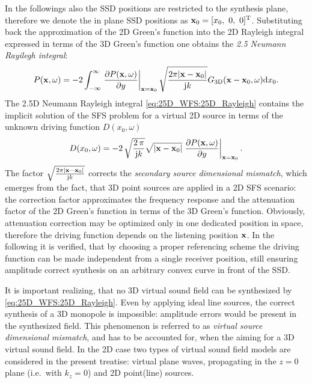 In the followings also the SSD positions are restricted to the synthesis plane, therefore we denote the in plane SSD positions as $\mathbf{x}_0 = [x_0,\ 0,\ 0]^{\mathrm{T}}$.
Substituting back the approximation of the 2D Green's function into the 2D Rayleigh integral expressed in terms of the 3D Green's function one obtains the \emph{2.5 Neumann Rayilegh integral}:
\begin{equation}
P(\mathbf{x},\omega) = -2\int_{-\infty}^{\infty} \left.
\frac{\partial P(\mathbf{x},\omega)}{\partial y} \right|_{\mathbf{x} = \mathbf{x}_0}\sqrt{\frac{2\pi |\mathbf{x}-\mathbf{x}_0|}{\mathrm{j} k}} G_{3\mathrm{D}}(\mathbf{x}-\mathbf{x}_0,\omega) \mathrm{d} x_0.
\label{eq:25D_WFS:25D_Rayleigh} 
\end{equation}
The 2.5D Neumann Rayleigh integral \eqref{eq:25D_WFS:25D_Rayleigh}  contains the implicit solution of the SFS problem for a virtual 2D source in terms of the unknown driving function $D(x_0, \omega)$
\begin{equation}
D(x_0,\omega) = 
- 2\,\sqrt{\frac{2\,\pi}{\mathrm{j} k}} \sqrt{|\mathbf{x}-\mathbf{x}_0|} \left.
\frac{\partial P(\mathbf{x},\omega)}{\partial y} \right|_{\mathbf{x}=\mathbf{x}_0}.
\label{Eq:2_5D_driv_fun_implicit}
\end{equation}
The factor $\sqrt{\frac{2\pi |\mathbf{x}-\mathbf{x}_0|}{\mathrm{j} k}}$ corrects the \emph{secondary source dimensional mismatch}, which emerges from the fact, that 3D point sources are applied in a 2D SFS scenario: the correction factor approximates the frequency response and the attenuation factor of the 2D Green's function in terms of the 3D Green's function.
Obviously, attenuation correction may be optimized only in one dedicated position in space, therefore the driving function depends on the listening position $\mathbf{x}$.
In the following it is verified, that by choosing a proper referencing scheme the driving function can be made independent from a single receiver position, still ensuring amplitude correct synthesis on an arbitrary convex curve in front of the SSD.

It is important realizing, that no 3D virtual sound field can be synthesized by \eqref{eq:25D_WFS:25D_Rayleigh}.
Even by applying ideal line sources, the correct synthesis of a 3D monopole is impossible: amplitude errors would be present in the synthesized field.
This phenomenon is referred to as \emph{virtual source dimensional mismatch}, and has to be accounted for, when the aiming for a 3D virtual sound field.
In the 2D case two types of virtual sound field models are considered in the present treatise: virtual plane waves, propagating in the $z=0$ plane (i.e.\ with $k_z = 0$) and 2D point(line) sources.

